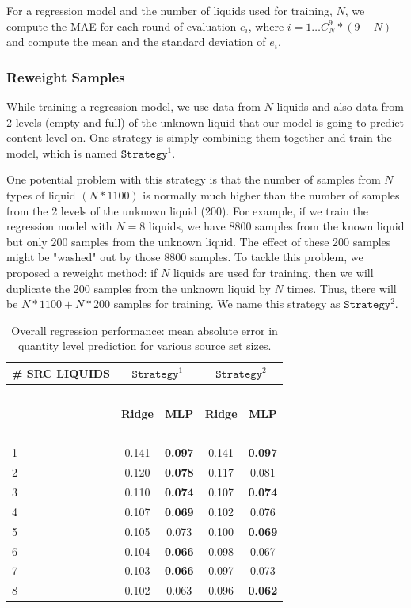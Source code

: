 \documentclass{article} %
\begin{document}
For a regression model and the number of liquids used for training, $N$, we compute the MAE for each round of evaluation $e_i$, where $i= 1\dots C_N^9 * (9-N)$ and compute the mean and the standard deviation of $e_i$.

\subsubsection{Reweight Samples}
While training a regression model, we use data from $N$ liquids and also data from 2 levels (empty and full) of the unknown liquid that our model is going to predict content level on. One strategy is simply combining them together and train the model, which is named $\mathtt{Strategy}^1$. 

One potential problem with this strategy is that the number of samples from $N$ types of liquid $(N * 1100)$ is normally much higher than the number of samples from the 2 levels of the unknown liquid (200). For example, if we train the regression model with $N = 8$ liquids, we have 8800 samples from the known liquid but only 200 samples from the unknown liquid. The effect of these 200 samples might be "washed" out by those 8800 samples. To tackle this problem, we proposed a reweight method: if $N$ liquids are used for training, then we will duplicate the 200 samples from the unknown liquid by $N$ times. Thus, there will be $N * 1100 + N * 200$ samples for training. We name this strategy as $\mathtt{Strategy}^2$.

\begin{table}[t]
\caption{Overall regression performance: mean absolute error in quantity level prediction for various source set sizes.}
\label{table:result}
\begin{center}
\begin{tabular}{ l | c | c | c | c}
\textbf{\# SRC LIQUIDS} & \multicolumn{2}{c|}{$\mathtt{Strategy}^1$} & \multicolumn{2}{c}{$\mathtt{Strategy}^2$} \\ \hline
~ & ~ & ~ & ~ & ~\\
~ & \textbf{Ridge} & \textbf{MLP} & \textbf{Ridge} & \textbf{MLP}\\ \hline
~ & ~ & ~ & ~ & ~\\
1 & 0.141 & \textbf{0.097} & 0.141 & \textbf{0.097}\\
2 & 0.120 & \textbf{0.078} & 0.117 & 0.081\\
3 & 0.110 & \textbf{0.074} & 0.107 & \textbf{0.074}\\
4 & 0.107 & \textbf{0.069} & 0.102 & 0.076\\
5 & 0.105 & 0.073 & 0.100 & \textbf{0.069}\\
6 & 0.104 & \textbf{0.066} & 0.098 & 0.067\\
7 & 0.103 & \textbf{0.066} & 0.097 & 0.073\\
8 & 0.102 & 0.063 & 0.096 & \textbf{0.062}\\
\end{tabular}
\end{center}
\end{table}
\end{document}
